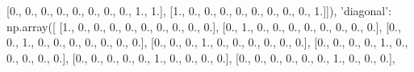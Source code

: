 \documentclass[11pt]{article}
\newenvironment{Shaded}{}{}
\newcommand{\DecValTok}[1]{\textcolor[rgb]{0.25,0.63,0.44}{{#1}}}
\newcommand{\StringTok}[1]{\textcolor[rgb]{0.25,0.44,0.63}{{#1}}}
\newcommand{\NormalTok}[1]{{#1}}
\begin{document}
\begin{Shaded}
\begin{Highlighting}[]
\NormalTok{        [}\DecValTok{0}\NormalTok{., }\DecValTok{0}\NormalTok{., }\DecValTok{0}\NormalTok{., }\DecValTok{0}\NormalTok{., }\DecValTok{0}\NormalTok{., }\DecValTok{0}\NormalTok{., }\DecValTok{0}\NormalTok{., }\DecValTok{0}\NormalTok{., }\DecValTok{1}\NormalTok{., }\DecValTok{1}\NormalTok{.],}
\NormalTok{        [}\DecValTok{1}\NormalTok{., }\DecValTok{0}\NormalTok{., }\DecValTok{0}\NormalTok{., }\DecValTok{0}\NormalTok{., }\DecValTok{0}\NormalTok{., }\DecValTok{0}\NormalTok{., }\DecValTok{0}\NormalTok{., }\DecValTok{0}\NormalTok{., }\DecValTok{0}\NormalTok{., }\DecValTok{1}\NormalTok{.]]),}
    \StringTok{'diagonal'}\NormalTok{: np.array([}
\NormalTok{        [}\DecValTok{1}\NormalTok{., }\DecValTok{0}\NormalTok{., }\DecValTok{0}\NormalTok{., }\DecValTok{0}\NormalTok{., }\DecValTok{0}\NormalTok{., }\DecValTok{0}\NormalTok{., }\DecValTok{0}\NormalTok{., }\DecValTok{0}\NormalTok{., }\DecValTok{0}\NormalTok{., }\DecValTok{0}\NormalTok{.],}
\NormalTok{        [}\DecValTok{0}\NormalTok{., }\DecValTok{1}\NormalTok{., }\DecValTok{0}\NormalTok{., }\DecValTok{0}\NormalTok{., }\DecValTok{0}\NormalTok{., }\DecValTok{0}\NormalTok{., }\DecValTok{0}\NormalTok{., }\DecValTok{0}\NormalTok{., }\DecValTok{0}\NormalTok{., }\DecValTok{0}\NormalTok{.],}
\NormalTok{        [}\DecValTok{0}\NormalTok{., }\DecValTok{0}\NormalTok{., }\DecValTok{1}\NormalTok{., }\DecValTok{0}\NormalTok{., }\DecValTok{0}\NormalTok{., }\DecValTok{0}\NormalTok{., }\DecValTok{0}\NormalTok{., }\DecValTok{0}\NormalTok{., }\DecValTok{0}\NormalTok{., }\DecValTok{0}\NormalTok{.],}
\NormalTok{        [}\DecValTok{0}\NormalTok{., }\DecValTok{0}\NormalTok{., }\DecValTok{0}\NormalTok{., }\DecValTok{1}\NormalTok{., }\DecValTok{0}\NormalTok{., }\DecValTok{0}\NormalTok{., }\DecValTok{0}\NormalTok{., }\DecValTok{0}\NormalTok{., }\DecValTok{0}\NormalTok{., }\DecValTok{0}\NormalTok{.],}
\NormalTok{        [}\DecValTok{0}\NormalTok{., }\DecValTok{0}\NormalTok{., }\DecValTok{0}\NormalTok{., }\DecValTok{0}\NormalTok{., }\DecValTok{1}\NormalTok{., }\DecValTok{0}\NormalTok{., }\DecValTok{0}\NormalTok{., }\DecValTok{0}\NormalTok{., }\DecValTok{0}\NormalTok{., }\DecValTok{0}\NormalTok{.],}
\NormalTok{        [}\DecValTok{0}\NormalTok{., }\DecValTok{0}\NormalTok{., }\DecValTok{0}\NormalTok{., }\DecValTok{0}\NormalTok{., }\DecValTok{0}\NormalTok{., }\DecValTok{1}\NormalTok{., }\DecValTok{0}\NormalTok{., }\DecValTok{0}\NormalTok{., }\DecValTok{0}\NormalTok{., }\DecValTok{0}\NormalTok{.],}
\NormalTok{        [}\DecValTok{0}\NormalTok{., }\DecValTok{0}\NormalTok{., }\DecValTok{0}\NormalTok{., }\DecValTok{0}\NormalTok{., }\DecValTok{0}\NormalTok{., }\DecValTok{0}\NormalTok{., }\DecValTok{1}\NormalTok{., }\DecValTok{0}\NormalTok{., }\DecValTok{0}\NormalTok{., }\DecValTok{0}\NormalTok{.],}

\end{Highlighting}
\end{Shaded}
\end{document}
